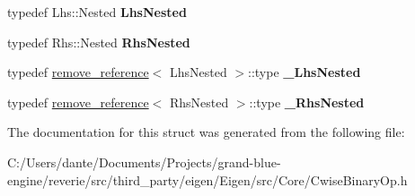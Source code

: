 \begin{DoxyCompactItemize}
typedef Lhs\+::\+Nested {\bfseries Lhs\+Nested}
\item 
\mbox{\label{struct_eigen_1_1internal_1_1traits_3_01_cwise_binary_op_3_01_binary_op_00_01_lhs_00_01_rhs_01_4_01_4_a59de2b2b29033b7cfab53e1f5b52718c}} 
typedef Rhs\+::\+Nested {\bfseries Rhs\+Nested}
\item 
\mbox{\label{struct_eigen_1_1internal_1_1traits_3_01_cwise_binary_op_3_01_binary_op_00_01_lhs_00_01_rhs_01_4_01_4_ae328452c3cfd91628ea98b98414e0b2a}} 
typedef \mbox{\hyperlink{struct_eigen_1_1internal_1_1remove__reference}{remove\+\_\+reference}}$<$ Lhs\+Nested $>$\+::type {\bfseries \+\_\+\+Lhs\+Nested}
\item 
\mbox{\label{struct_eigen_1_1internal_1_1traits_3_01_cwise_binary_op_3_01_binary_op_00_01_lhs_00_01_rhs_01_4_01_4_a84219d0382f4733aef9a89ae5929772a}} 
typedef \mbox{\hyperlink{struct_eigen_1_1internal_1_1remove__reference}{remove\+\_\+reference}}$<$ Rhs\+Nested $>$\+::type {\bfseries \+\_\+\+Rhs\+Nested}
\end{DoxyCompactItemize}


The documentation for this struct was generated from the following file\+:\begin{DoxyCompactItemize}
\item 
C\+:/\+Users/dante/\+Documents/\+Projects/grand-\/blue-\/engine/reverie/src/third\+\_\+party/eigen/\+Eigen/src/\+Core/Cwise\+Binary\+Op.\+h\end{DoxyCompactItemize}
